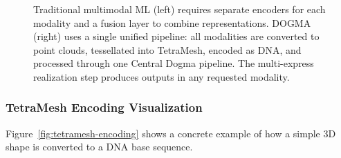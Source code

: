 \begin{figure}[ht]
\caption{Traditional multimodal ML (left) requires separate encoders for each modality and a fusion layer to combine representations. DOGMA (right) uses a single unified pipeline: all modalities are converted to point clouds, tessellated into TetraMesh, encoded as DNA, and processed through one Central Dogma pipeline. The multi-express realization step produces outputs in any requested modality.}
\label{fig:traditional-vs-dogma}
\end{figure}

\subsubsection{TetraMesh Encoding Visualization}

Figure~\ref{fig:tetramesh-encoding} shows a concrete example of how a simple 3D shape is converted to a DNA base sequence.

